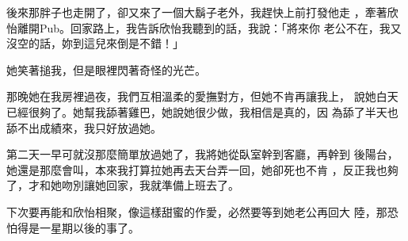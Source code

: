 後來那胖子也走開了，卻又來了一個大鬍子老外，我趕快上前打發他走
，牽著欣怡離開Pub。回家路上，我告訴欣怡我聽到的話，我說：「將來你
老公不在，我又沒空的話，妳到這兒來倒是不錯！」

她笑著搥我，但是眼裡閃著奇怪的光芒。

那晚她在我房裡過夜，我們互相溫柔的愛撫對方，但她不肯再讓我上，
說她白天已經很夠了。她幫我舔著雞巴，她說她很少做，我相信是真的，因
為舔了半天也舔不出成績來，我只好放過她。

第二天一早可就沒那麼簡單放過她了，我將她從臥室幹到客廳，再幹到
後陽台，她還是那麼會叫，本來我打算拉她再去天台弄一回，她卻死也不肯
，反正我也夠了，才和她吻別讓她回家，我就準備上班去了。

下次要再能和欣怡相聚，像這樣甜蜜的作愛，必然要等到她老公再回大
陸，那恐怕得是一星期以後的事了。
